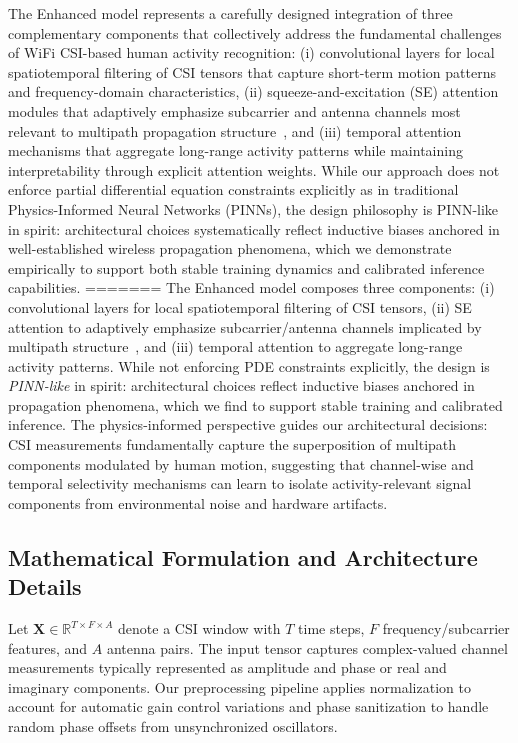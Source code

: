 \documentclass[journal]{IEEEtran}
\begin{document}
The Enhanced model represents a carefully designed integration of three complementary components that collectively address the fundamental challenges of WiFi CSI-based human activity recognition: (i) convolutional layers for local spatiotemporal filtering of CSI tensors that capture short-term motion patterns and frequency-domain characteristics, (ii) squeeze-and-excitation (SE) attention modules that adaptively emphasize subcarrier and antenna channels most relevant to multipath propagation structure~\cite{se_networks2018}, and (iii) temporal attention mechanisms that aggregate long-range activity patterns while maintaining interpretability through explicit attention weights. While our approach does not enforce partial differential equation constraints explicitly as in traditional Physics-Informed Neural Networks (PINNs), the design philosophy is PINN-like in spirit: architectural choices systematically reflect inductive biases anchored in well-established wireless propagation phenomena, which we demonstrate empirically to support both stable training dynamics and calibrated inference capabilities.
=======
The Enhanced model composes three components: (i) convolutional layers for local spatiotemporal filtering of CSI tensors, (ii) SE attention to adaptively emphasize subcarrier/antenna channels implicated by multipath structure~\cite{se_networks2018}, and (iii) temporal attention to aggregate long-range activity patterns. While not enforcing PDE constraints explicitly, the design is \emph{PINN-like} in spirit: architectural choices reflect inductive biases anchored in propagation phenomena, which we find to support stable training and calibrated inference. The physics-informed perspective guides our architectural decisions: CSI measurements fundamentally capture the superposition of multipath components modulated by human motion, suggesting that channel-wise and temporal selectivity mechanisms can learn to isolate activity-relevant signal components from environmental noise and hardware artifacts.

\subsection{Mathematical Formulation and Architecture Details}
Let $\mathbf{X}\in \mathbb{R}^{T\times F\times A}$ denote a CSI window with $T$ time steps, $F$ frequency/subcarrier features, and $A$ antenna pairs. The input tensor captures complex-valued channel measurements typically represented as amplitude and phase or real and imaginary components. Our preprocessing pipeline applies normalization to account for automatic gain control variations and phase sanitization to handle random phase offsets from unsynchronized oscillators.
\end{document}
